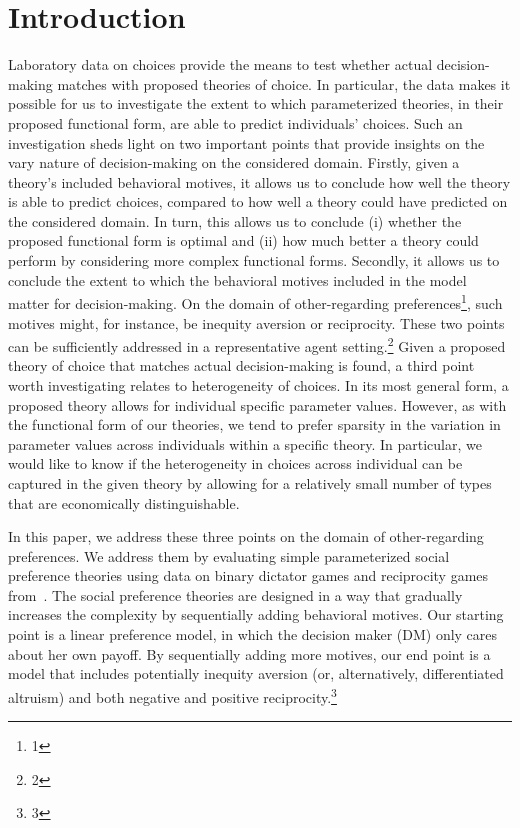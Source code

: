 \documentclass[letterpaper,11pt,leqno]{article}
\begin{document}
\section{Introduction}\label{s:introduction}

Laboratory data on choices provide the means to test whether actual decision-making matches with proposed theories of choice. In particular, the data makes it possible for us to investigate the extent to which parameterized theories, in their proposed functional form, are able to predict individuals' choices. Such an investigation sheds light on two important points that provide insights on the vary nature of decision-making on the considered domain. Firstly, given a theory's included behavioral motives, it allows us to conclude how well the theory is able to predict choices, compared to how well a theory could have predicted on the considered domain. In turn, this allows us to conclude (i) whether the proposed functional form is optimal and (ii) how much better a theory could perform by considering more complex functional forms. Secondly, it allows us to conclude the extent to which the behavioral motives included in the model matter for decision-making. On the domain of other-regarding preferences\footnote{1}, such motives might, for instance, be inequity aversion or reciprocity. These two points can be sufficiently addressed in a representative agent setting.\footnote{2} Given a proposed theory of choice that matches actual decision-making is found, a third point worth investigating relates to heterogeneity of choices. In its most general form, a proposed theory allows for individual specific parameter values. However, as with the functional form of our theories, we tend to prefer sparsity in the variation in parameter values across individuals within a specific theory. In particular, we would like to know if the heterogeneity in choices across individual can be captured in the given theory by allowing for a relatively small number of types that are economically distinguishable.

In this paper, we address these three points on the domain of other-regarding preferences. We address them by evaluating simple parameterized social preference theories using data on binary dictator games and reciprocity games from~\cite{Bruhin2019}. The social preference theories are designed in a way that gradually increases the complexity by sequentially adding behavioral motives. Our starting point is a linear preference model, in which the decision maker (DM) only cares about her own payoff. By sequentially adding more motives, our end point is a model that includes potentially inequity aversion (or, alternatively, differentiated altruism) and both negative and positive reciprocity.\footnote{3}
\end{document}
